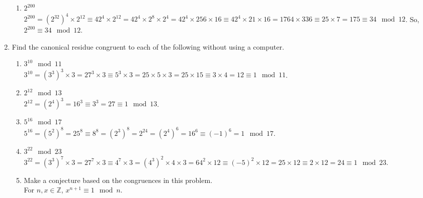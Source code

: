 \documentclass{article}
\begin{document}
\begin{enumerate}
\begin{enumerate}
                  \item $2^{200}$\\
                        $2^{200} = (2^{32})^{4} \times 2^{12} \equiv 42^{4} \times 2^{12} = 42^{4} \times 2^{8} \times 2^{4} = 42^{4} \times 256 \times 16 \equiv 42^{4} \times 21 \times 16 = 1764 \times 336 \equiv 25 \times 7 = 175 \equiv 34 \mod{12}$. So, $2^{200} \equiv 34 \mod{12}$.
            \end{enumerate}
      \item Find the canonical residue congruent to each of the following without using a computer.
            \begin{enumerate}
                  \item $3^{10} \mod{11}$\\
                        $3^{10} = (3^{3})^{3} \times 3 = 27^{3} \times 3 \equiv 5^{3} \times 3 = 25 \times 5 \times 3 = 25 \times 15 \equiv 3 \times 4 = 12 \equiv 1 \mod{11}$.
                  \item $2^{12} \mod{13}$\\
                        $2^{12} = (2^{4})^{3} = 16^{3} \equiv 3^{3} = 27 \equiv 1 \mod{13}$.
                  \item $5^{16} \mod{17}$\\
                        $5^{16} = (5^{2})^{8} = 25^{8} \equiv 8^{8} = (2^{3})^{8} = 2^{24} = (2^{4})^{6} = 16^{6} \equiv (-1)^{6} = 1 \mod{17}$.
                  \item $3^{22} \mod{23}$\\
                  $3^{22} = (3^{3})^{7} \times 3 = 27^{7} \times 3 \equiv 4^{7} \times 3 = (4^{3})^{2} \times 4 \times 3 = 64^{2} \times 12 \equiv (-5)^{2} \times 12 = 25 \times 12 \equiv 2 \times 12 = 24 \equiv 1 \mod{23}$.
                  \item Make a conjecture based on the congruences in this problem.\\
                  For $n, x \in \mathbb{Z}$, $x^{n+1} \equiv 1 \mod{n}$.
            \end{enumerate}
\end{enumerate}
\end{document}
